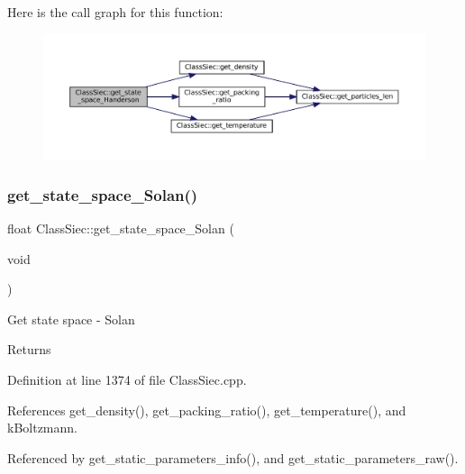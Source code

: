 Here is the call graph for this function\+:
\nopagebreak
\begin{figure}[H]
\begin{center}
\leavevmode
\includegraphics[width=350pt]{classClassSiec_a36144a1734674d3f0c6899c348da1a97_cgraph}
\end{center}
\end{figure}
\mbox{\label{classClassSiec_a3a0171519c3557d8edec22edb5978c9c}} 
\subsubsection{\texorpdfstring{get\+\_\+state\+\_\+space\+\_\+\+Solan()}{get\_state\_space\_Solan()}}
{\footnotesize\ttfamily float Class\+Siec\+::get\+\_\+state\+\_\+space\+\_\+\+Solan (\begin{DoxyParamCaption}\item[{void}]{ }\end{DoxyParamCaption})}

Get state space -\/ Solan \begin{DoxyReturn}{Returns}

\end{DoxyReturn}


Definition at line 1374 of file Class\+Siec.\+cpp.



References get\+\_\+density(), get\+\_\+packing\+\_\+ratio(), get\+\_\+temperature(), and k\+Boltzmann.



Referenced by get\+\_\+static\+\_\+parameters\+\_\+info(), and get\+\_\+static\+\_\+parameters\+\_\+raw().

